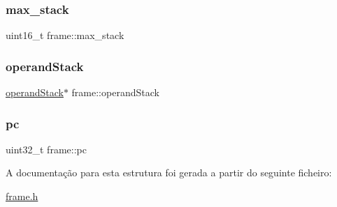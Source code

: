 \hypertarget{structframe_a21004a70deb96c08f1dd6fd30f610b51}{}\label{structframe_a21004a70deb96c08f1dd6fd30f610b51} 
\subsubsection{\texorpdfstring{max\+\_\+stack}{max\_stack}}
{\footnotesize\ttfamily uint16\+\_\+t frame\+::max\+\_\+stack}

\hypertarget{structframe_a2247e2a31594f7c5b3f6de0f6dc4ca18}{}\label{structframe_a2247e2a31594f7c5b3f6de0f6dc4ca18} 
\subsubsection{\texorpdfstring{operand\+Stack}{operandStack}}
{\footnotesize\ttfamily \hyperlink{structoperand_stack}{operand\+Stack}$\ast$ frame\+::operand\+Stack}

\hypertarget{structframe_a5915ace0f09c12110a4571ac827baf44}{}\label{structframe_a5915ace0f09c12110a4571ac827baf44} 
\subsubsection{\texorpdfstring{pc}{pc}}
{\footnotesize\ttfamily uint32\+\_\+t frame\+::pc}



A documentação para esta estrutura foi gerada a partir do seguinte ficheiro\+:\begin{DoxyCompactItemize}
\item 
\hyperlink{frame_8h}{frame.\+h}\end{DoxyCompactItemize}
